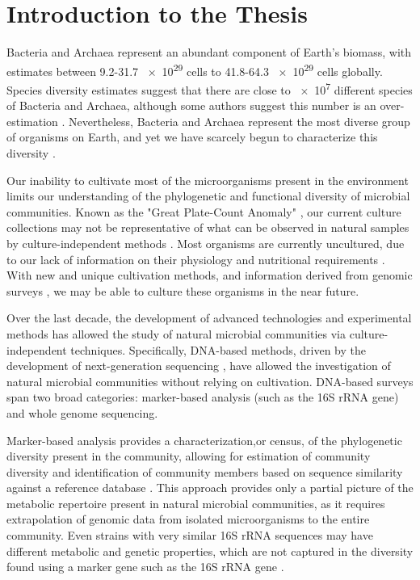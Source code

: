 
\chapter{Introduction to the Thesis}

    Bacteria and Archaea represent an abundant component of Earth's biomass, with estimates between 9.2-31.7 \num{e29} cells \cite{Kallmeyer:2012km} to 41.8-64.3 \num{e29} cells \cite{Whitman:1998tj} globally. Species diversity estimates suggest that there are close to \num{e7} different species of Bacteria and Archaea\cite{Curtis:2002dj}, although some authors suggest this number is an over-estimation \cite{Schloss:2004do}. Nevertheless, Bacteria and Archaea represent the most diverse group of organisms on Earth, and yet we have scarcely begun to characterize this diversity \cite{Wu:2009ju, Rinke:2013bt}.

    Our inability to cultivate most of the microorganisms present in the environment limits our understanding of the phylogenetic and functional diversity of microbial communities. Known as the "Great Plate-Count Anomaly" \cite{Staley:1985ww}, our current culture collections may not be representative of what can be observed in natural samples by culture-independent methods \cite{Amann:1995tw}. Most organisms are currently uncultured, due to our lack of information on their physiology and nutritional requirements \cite{Stewart:2012dd}. With new and unique cultivation methods, and information derived from genomic surveys \cite{Tyson:2005by}, we may be able to culture these organisms in the near future.
    
   Over the last decade, the development of advanced technologies and experimental methods has allowed the study of natural microbial communities via culture-independent techniques. Specifically, DNA-based methods, driven by the development of next-generation sequencing \cite{Mardis:2008fr}, have allowed the investigation of natural microbial communities without relying on cultivation. DNA-based surveys span two broad categories: marker-based analysis (such as the 16S rRNA gene) and whole genome sequencing.
    
    Marker-based analysis provides a characterization,or census, of the phylogenetic diversity present in the community, allowing for estimation of community diversity\cite{Caporaso:2011cs, Rappe:2003fc, Caporaso:2010bi} and identification of community members based on sequence similarity against a reference database  \cite{McDonald:2011hn}. This approach provides only a partial picture of the metabolic repertoire present in natural microbial communities, as it requires extrapolation of genomic data from isolated microorganisms to the entire community. Even strains with very similar 16S rRNA sequences may have different metabolic and genetic properties, which are not captured in the diversity found using a marker gene such as the 16S rRNA gene \cite{Jaspers:2004ge}.
    
